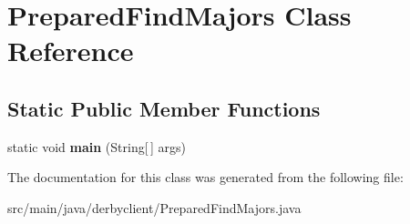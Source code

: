 \hypertarget{classPreparedFindMajors}{}\section{Prepared\+Find\+Majors Class Reference}
\label{classPreparedFindMajors}
\subsection*{Static Public Member Functions}
\begin{DoxyCompactItemize}
\item 
\mbox{\label{classPreparedFindMajors_afdce0a82b5a949979d4f3b8cc59c7d3d}} 
static void {\bfseries main} (String\mbox{[}$\,$\mbox{]} args)
\end{DoxyCompactItemize}


The documentation for this class was generated from the following file\+:\begin{DoxyCompactItemize}
\item 
src/main/java/derbyclient/Prepared\+Find\+Majors.\+java\end{DoxyCompactItemize}
